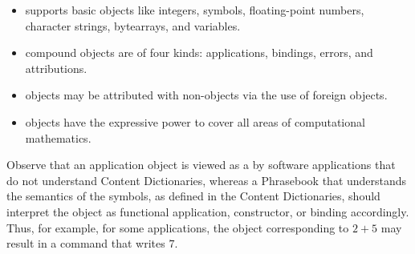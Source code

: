 \begin{itemize}
\item \OM supports basic objects like integers, symbols, floating-point numbers, character
  strings, bytearrays, and variables.
\item \OM compound objects are of four kinds: applications, bindings, errors, and
  attributions.
\item \OM objects may be attributed with non-\OM objects via the use of foreign \OM
  objects.
\item \OM objects have the expressive power to cover all areas of computational
  mathematics.
\end{itemize}

Observe that an \OM application object is viewed as a  by software
applications that do not understand Content Dictionaries, whereas a Phrasebook that
understands the semantics of the symbols, as defined in the Content Dictionaries, should
interpret the object as functional application, constructor, or binding accordingly. Thus,
for example, for some applications, the \OM object corresponding to $2+5$ may result in a
command that writes $7$.



